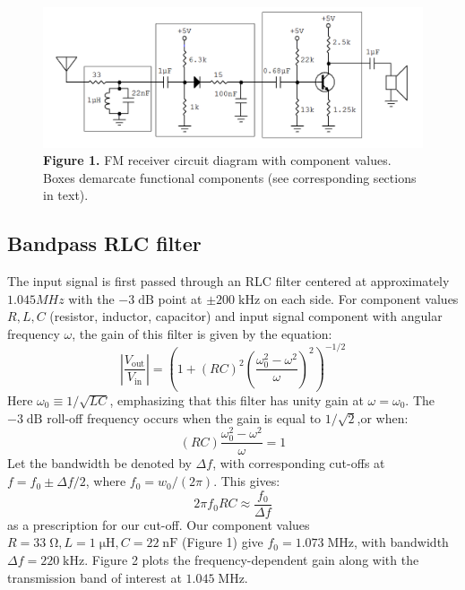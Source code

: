 \documentclass[11pt]{article}
\newcommand {\mt}{\mathrm}
\newcommand {\unit}[1]{\; \mt{#1}}
\begin{document}
\begin{figure}[h]
    \centering
    \includegraphics[scale=0.5]{schematics/receiver_box.png} \\
    \textbf{Figure 1.} FM receiver circuit diagram with component values. Boxes
    demarcate functional components (see corresponding sections in text).
\end{figure}

\subsection{Bandpass RLC filter}

The input signal is first passed through an RLC filter centered at
approximately $1.045 MHz$ with the $-3 \unit{dB}$ point at $\pm 200 \unit{kHz}$
on each side.  For component values $R, L, C$ (resistor, inductor, capacitor)
and input signal component with angular frequency $\omega$, the gain of this
filter is given by the equation:
\[
  \left| \frac{V_{\mt{out}}}{V_{\mt{in}}} \right| =
    \left(
      1 + (RC)^2 \left(\frac{\omega_0^2 - \omega^2}{\omega}\right)^2
    \right)^{-1/2}
\]
Here $\omega_0 \equiv 1 / \sqrt{LC}$, emphasizing that this filter has unity
gain at $\omega = \omega_0$.  The $-3 \unit{dB}$ roll-off frequency occurs
when the gain is equal to $1/\sqrt{2}$,or when:
\[
  (RC) \frac{\omega_0^2-\omega^2}{\omega} = 1
\]
Let the bandwidth be denoted by $\Delta f$, with corresponding cut-offs at
$f = f_0 \pm \Delta f /2$, where $f_0 = w_0/(2\pi)$.  This gives:
\[
  2 \pi f_0 RC \approx \frac{f_0}{\Delta f}
\]
as a prescription for our cut-off.  Our component values $R = 33 \unit{\Omega},
L = 1 \unit{\mu H}, C = 22 \unit{nF}$ (Figure 1) give $f_0 = 1.073 \unit{MHz}$,
with bandwidth $\Delta f = 220 \unit{kHz}$.  Figure 2 plots the
frequency-dependent gain along with the transmission band of interest at $1.045
\unit{MHz}$.
\end{document}
